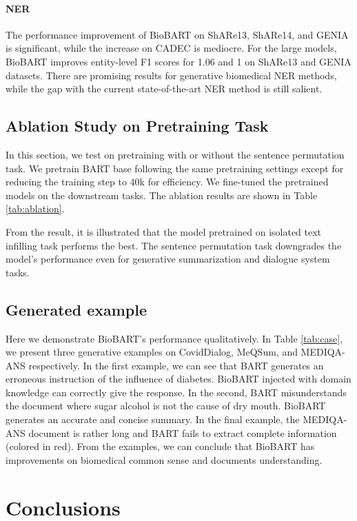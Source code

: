 \documentclass[11pt]{article}
\begin{document}
\paragraph{NER} The performance improvement of BioBART on ShARe13, ShARe14, and GENIA is significant, while the increase on CADEC is mediocre. For the large models, BioBART improves entity-level F1 scores for 1.06 and 1 on ShARe13 and GENIA datasets. There are promising results for generative biomedical NER methods, while the gap with the current state-of-the-art NER method \cite{w2ner} is still salient.


\subsection{Ablation Study on Pretraining Task}



In this section, we test on pretraining with or without the sentence permutation task. We pretrain BART base following the same pretraining settings except for reducing the training step to 40k for efficiency. We fine-tuned the pretrained models on the downstream tasks. The ablation results are shown in Table \ref{tab:ablation}.


From the result, it is illustrated that the model pretrained on isolated text infilling task performs the best. The sentence permutation task downgrades the model's performance even for generative summarization and dialogue system tasks. 


\subsection{Generated example}


Here we demonstrate BioBART's performance qualitatively. In Table \ref{tab:case}, we present three generative examples on CovidDialog, MeQSum, and MEDIQA-ANS respectively. In the first example, we can see that BART generates an erroneous instruction of the influence of diabetes. BioBART injected with domain knowledge can correctly give the response. In the second, BART misunderstands the document where sugar alcohol is not the cause of dry mouth. BioBART generates an accurate and concise summary. In the final example, the MEDIQA-ANS document is rather long and BART fails to extract complete information (colored in red).
From the examples, we can conclude that BioBART has improvements on biomedical common sense and documents understanding.


\section{Conclusions}
\end{document}
